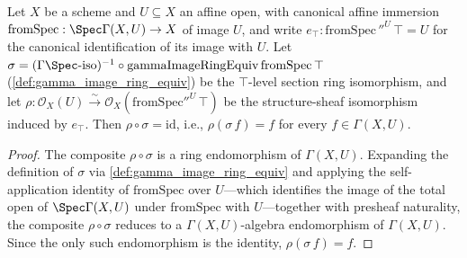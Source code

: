 \begin{lemma}
  \label{lem:fromSpec_image_top_section_coherence}
  Let \(X\) be a scheme and \(U \subseteq X\) an affine open, with canonical affine immersion
  \(\mathrm{fromSpec} : \Spec \Gamma(X, U) \to X\) of image \(U\), and write
  \(e_{\top} : \mathrm{fromSpec}\,''^{U}\,\top = U\) for the canonical identification of its image
  with \(U\). Let
  \(\sigma = (\Gamma\Spec\text{-iso})^{-1} \circ \mathrm{gammaImageRingEquiv}\,\mathrm{fromSpec}\,\top\)
  (\cref{def:gamma_image_ring_equiv}) be the \(\top\)-level section ring isomorphism, and let
  \(\rho : \mathcal{O}_X(U) \xrightarrow{\sim} \mathcal{O}_X(\mathrm{fromSpec}''^{U}\,\top)\) be the
  structure-sheaf isomorphism induced by \(e_{\top}\). Then \(\rho \circ \sigma = \mathrm{id}\), i.e.,
  \(\rho(\sigma\,f) = f\) for every \(f \in \Gamma(X, U)\).
\end{lemma}
\begin{proof}
  The composite \(\rho \circ \sigma\) is a ring endomorphism of \(\Gamma(X, U)\). Expanding the
  definition of \(\sigma\) via \cref{def:gamma_image_ring_equiv} and applying the self-application
  identity of \(\mathrm{fromSpec}\) over \(U\)---which identifies the image of the total open of
  \(\Spec\Gamma(X,U)\) under \(\mathrm{fromSpec}\) with \(U\)---together with presheaf naturality,
  the composite \(\rho \circ \sigma\) reduces to a \(\Gamma(X,U)\)-algebra endomorphism of
  \(\Gamma(X,U)\). Since the only such endomorphism is the identity, \(\rho(\sigma\,f) = f\).
\end{proof}

